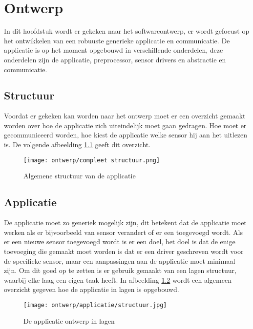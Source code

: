 \chapter{Ontwerp}
In dit hoofdstuk wordt er gekeken naar het softwareontwerp, er wordt gefocust op het ontwikkelen van een robuuste generieke applicatie en communicatie. De applicatie is op het moment opgebouwd in verschillende onderdelen, deze onderdelen zijn de applicatie, preprocessor, sensor drivers en abstractie en communicatie.

\section{Structuur}
Voordat er gekeken kan worden naar het ontwerp moet er een overzicht gemaakt worden over hoe de applicatie zich uiteindelijk moet gaan gedragen. Hoe moet er gecommuniceerd worden, hoe kiest de applicatie welke sensor hij aan het uitlezen is. De volgende afbeelding \ref{fig:appstructuur} geeft dit overzicht. 
\begin{figure}[h!]
	\centering
	\label{fig:appstructuur}
	\texttt{[image: ontwerp/compleet structuur.png]}
	\caption{Algemene structuur van de applicatie}
\end{figure}

\newpage
\section{Applicatie}
De applicatie moet zo generiek mogelijk zijn, dit betekent dat de applicatie moet werken als er bijvoorbeeld van sensor verandert of er een toegevoegd wordt. Als er een nieuwe sensor toegevoegd wordt is er een doel, het doel is dat de enige toevoeging die gemaakt moet worden is dat er een driver geschreven wordt voor de specifieke sensor, maar een aanpassingen aan de applicatie moet minimaal zijn. Om dit goed op te zetten is er gebruik gemaakt van een lagen structuur, waarbij elke laag een eigen taak heeft. In afbeelding \ref{fig:appontwerp} wordt een algemeen overzicht gegeven hoe de applicatie in lagen is opgebouwd. 
\begin{figure}[h!]
	\centering
	\label{fig:appontwerp}

	\texttt{[image: ontwerp/applicatie/structuur.jpg]}
	\caption{De applicatie ontwerp in lagen}
\end{figure}

